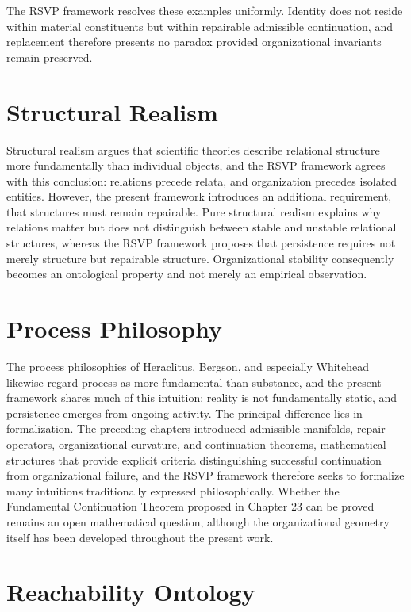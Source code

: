 \documentclass[11pt,oneside]{book}
\numberwithin{equation}{chapter}
\theoremstyle{definition}
\theoremstyle{plain}
\begin{document}
The RSVP framework resolves these examples uniformly. Identity does not reside within material constituents but within repairable admissible continuation, and replacement therefore presents no paradox provided organizational invariants remain preserved.

\section{Structural Realism}

Structural realism argues that scientific theories describe relational structure more fundamentally than individual objects, and the RSVP framework agrees with this conclusion: relations precede relata, and organization precedes isolated entities. However, the present framework introduces an additional requirement, that structures must remain repairable. Pure structural realism explains why relations matter but does not distinguish between stable and unstable relational structures, whereas the RSVP framework proposes that persistence requires not merely structure but repairable structure. Organizational stability consequently becomes an ontological property and not merely an empirical observation.

\section{Process Philosophy}

The process philosophies of Heraclitus, Bergson, and especially Whitehead likewise regard process as more fundamental than substance, and the present framework shares much of this intuition: reality is not fundamentally static, and persistence emerges from ongoing activity. The principal difference lies in formalization. The preceding chapters introduced admissible manifolds, repair operators, organizational curvature, and continuation theorems, mathematical structures that provide explicit criteria distinguishing successful continuation from organizational failure, and the RSVP framework therefore seeks to formalize many intuitions traditionally expressed philosophically. Whether the Fundamental Continuation Theorem proposed in Chapter 23 can be proved remains an open mathematical question, although the organizational geometry itself has been developed throughout the present work.

\section{Reachability Ontology}
\end{document}
